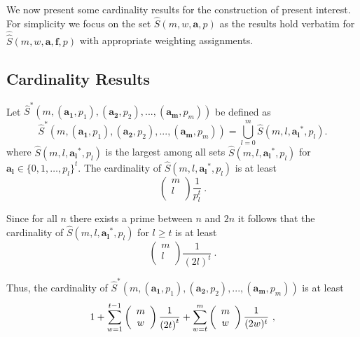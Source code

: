 We now present some cardinality results for the construction of
present interest. For simplicity we focus on the set
$\hat{S}(m,w,\mathbf{a},p)$ as the results hold verbatim for
$\hat{\hat{S}}(m,w,\mathbf{a},\mathbf{f}, p)$ with appropriate
weighting assignments.
\subsection{Cardinality Results}

 Let
$\hat{S}^*\left(m,(\mathbf{a_1},p_1),(\mathbf{a_2},p_2),...,(\mathbf{a_m},p_m)\right)$
be defined as
\begin{equation}\label{union}\hat{S}^*\left(m,(\mathbf{a_1},p_1),(\mathbf{a_2},p_2),...,(\mathbf{a_m},p_m)\right)=
\bigcup_{l=0}^{m} \hat{S}(m,l,\mathbf{a_l}^*,p_l).\end{equation}
where $\hat{S}(m,l,\mathbf{a_l}^*,p_l)$ is the largest among all
sets $\hat{S}(m,l,\mathbf{a_l}^*,p_l)$ for $\mathbf{a_l} \in
\{0,1,\dots,p_l\}^t$. The cardinality of
$\hat{S}(m,l,\mathbf{a_l}^*,p_l)$ is at least \[ \left(
\begin{array}{c}
                             m \\
                             l \\
                           \end{array}
                           \right) \frac{1}{p_l^t}~.\]

Since for all $n$ there exists a prime between $n$ and $2n$ it
follows that the cardinality of $\hat{S}(m,l,\mathbf{a_l}^*,p_l)$
for $l\geq t$ is at least \[ \left(
\begin{array}{c}
                             m \\
                             l \\
                           \end{array}
                           \right) \frac{1}{(2l)^t}~.\]

Thus, the cardinality of
$\hat{S}^*\left(m,(\mathbf{a_1},p_1),(\mathbf{a_2},p_2),...,(\mathbf{a_m},p_m)\right)$
is at least
\begin{equation}\label{up1}1+\sum_{w=1}^{t-1} \left(
\begin{array}{c}
                            m \\
                             w \\
                           \end{array}
                           \right) {\large \frac{1}{\left(2t\right)^t}} +\sum_{w=t}^m \left(
\begin{array}{c}
                            m \\
                             w \\
                           \end{array}
                           \right) \frac{1}{(2w)^t}~,
\end{equation}

